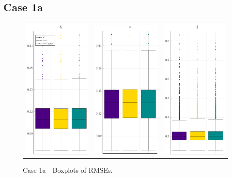 \subsection{Case 1a}
\begin{figure}[ht]
	\centering \begin{tabular}[b]{c c c}
		\includegraphics[width=.3\textwidth]{Figures/1a/RMSE_b.pdf} & \includegraphics[width=.3\textwidth]{Figures/1a/RMSE_a.pdf} & \includegraphics[width=.3\textwidth]{Figures/1a/RMSE_t.pdf}
	\end{tabular}
	\caption{Case 1a - Boxplots of RMSEs.}
	\label{fig:bpRMSE1a}
\end{figure}
